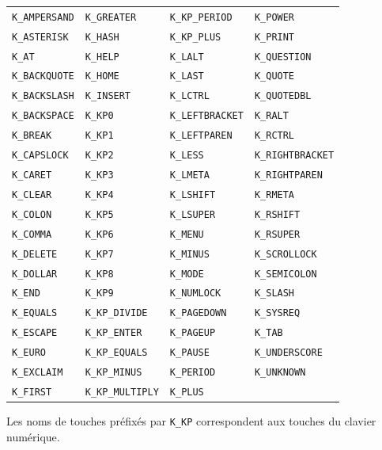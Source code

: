 \begin{center}
\begin{tabular}{l l l l}
\texttt{K\_AMPERSAND} & \texttt{K\_GREATER}      & \texttt{K\_KP\_PERIOD}  & \texttt{K\_POWER}        \\
\texttt{K\_ASTERISK}  & \texttt{K\_HASH}         & \texttt{K\_KP\_PLUS}    & \texttt{K\_PRINT}        \\
\texttt{K\_AT}        & \texttt{K\_HELP}         & \texttt{K\_LALT}        & \texttt{K\_QUESTION}     \\
\texttt{K\_BACKQUOTE} & \texttt{K\_HOME}         & \texttt{K\_LAST}        & \texttt{K\_QUOTE}        \\
\texttt{K\_BACKSLASH} & \texttt{K\_INSERT}       & \texttt{K\_LCTRL}       & \texttt{K\_QUOTEDBL}     \\
\texttt{K\_BACKSPACE} & \texttt{K\_KP0}          & \texttt{K\_LEFTBRACKET} & \texttt{K\_RALT}         \\
\texttt{K\_BREAK}     & \texttt{K\_KP1}          & \texttt{K\_LEFTPAREN}   & \texttt{K\_RCTRL}        \\
\texttt{K\_CAPSLOCK}  & \texttt{K\_KP2}          & \texttt{K\_LESS}        & \texttt{K\_RIGHTBRACKET} \\
\texttt{K\_CARET}     & \texttt{K\_KP3}          & \texttt{K\_LMETA}       & \texttt{K\_RIGHTPAREN}   \\
\texttt{K\_CLEAR}     & \texttt{K\_KP4}          & \texttt{K\_LSHIFT}      & \texttt{K\_RMETA}        \\
\texttt{K\_COLON}     & \texttt{K\_KP5}          & \texttt{K\_LSUPER}      & \texttt{K\_RSHIFT}       \\
\texttt{K\_COMMA}     & \texttt{K\_KP6}          & \texttt{K\_MENU}        & \texttt{K\_RSUPER}       \\
\texttt{K\_DELETE}    & \texttt{K\_KP7}          & \texttt{K\_MINUS}       & \texttt{K\_SCROLLOCK}    \\
\texttt{K\_DOLLAR}    & \texttt{K\_KP8}          & \texttt{K\_MODE}        & \texttt{K\_SEMICOLON}    \\
\texttt{K\_END}       & \texttt{K\_KP9}          & \texttt{K\_NUMLOCK}     & \texttt{K\_SLASH}        \\
\texttt{K\_EQUALS}    & \texttt{K\_KP\_DIVIDE}   & \texttt{K\_PAGEDOWN}    & \texttt{K\_SYSREQ}       \\
\texttt{K\_ESCAPE}    & \texttt{K\_KP\_ENTER}    & \texttt{K\_PAGEUP}      & \texttt{K\_TAB}          \\
\texttt{K\_EURO}      & \texttt{K\_KP\_EQUALS}   & \texttt{K\_PAUSE}       & \texttt{K\_UNDERSCORE}   \\
\texttt{K\_EXCLAIM}   & \texttt{K\_KP\_MINUS}    & \texttt{K\_PERIOD}      & \texttt{K\_UNKNOWN}      \\
\texttt{K\_FIRST}     & \texttt{K\_KP\_MULTIPLY} & \texttt{K\_PLUS}        & 
\end{tabular}
\end{center}
\bigskip
Les noms de touches préfixés par \texttt{K\_KP} correspondent aux touches du clavier numérique.

